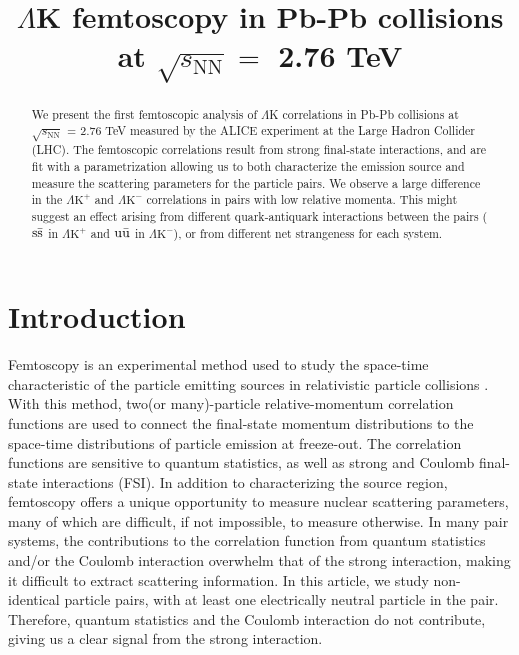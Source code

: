 \documentclass[ALICE,manyauthors]{cernphprep}
\newcommand{\LamK}{$\Lambda$K\xspace}
\newcommand{\LamKchP}{$\Lambda\mathrm{K^{+}}$\xspace}
\newcommand{\LamKchM}{$\Lambda\mathrm{K^{-}}$\xspace}
\begin{document}
%

\begin{titlepage}
%
%

\title{\LamK femtoscopy in Pb-Pb collisions at $\sqrt{s_{\mathrm{NN}}} = $ 2.76 TeV}
\ShortTitle{\LamK femtoscopy in Pb-Pb collisions}   %


\begin{abstract}
We present the first femtoscopic analysis of \LamK correlations in Pb-Pb collisions at $\sqrt{s_{\mathrm{NN}}}$ = 2.76 TeV measured by the ALICE experiment at the Large Hadron Collider (LHC).  
The femtoscopic correlations result from strong final-state interactions, and are fit with a parametrization allowing us to both characterize the emission source and measure the scattering parameters for the particle pairs.  
We observe a large difference in the \LamKchP and \LamKchM correlations in pairs with low relative momenta.  
This might suggest an effect arising from different quark-antiquark interactions between the pairs ($\rm s\bar{s}$ in \LamKchP and $\rm u\bar{u}$ in \LamKchM), or from different net strangeness for each system.
\end{abstract}
\end{titlepage}
\setcounter{page}{2}

\section{Introduction}
\label{sec:Introduction}

Femtoscopy is an experimental method used to study the space-time characteristic of the particle emitting sources in relativistic particle collisions \cite{Lisa:2005dd}.  
With this method, two(or many)-particle relative-momentum correlation functions are used to connect the final-state momentum distributions to the space-time distributions of particle emission at freeze-out.  
The correlation functions are sensitive to quantum statistics, as well as strong and Coulomb final-state interactions (FSI).  
In addition to characterizing the source region, femtoscopy offers a unique opportunity to measure nuclear scattering parameters, many of which are difficult, if not impossible, to measure otherwise.  
In many pair systems, the contributions to the correlation function from quantum statistics and/or the Coulomb interaction overwhelm that of the strong interaction, making it difficult to extract scattering information.  
In this article, we study non-identical particle pairs, with at least one electrically neutral particle in the pair.  
Therefore, quantum statistics and the Coulomb interaction do not contribute, giving us a clear signal from the strong interaction.
\end{document}
